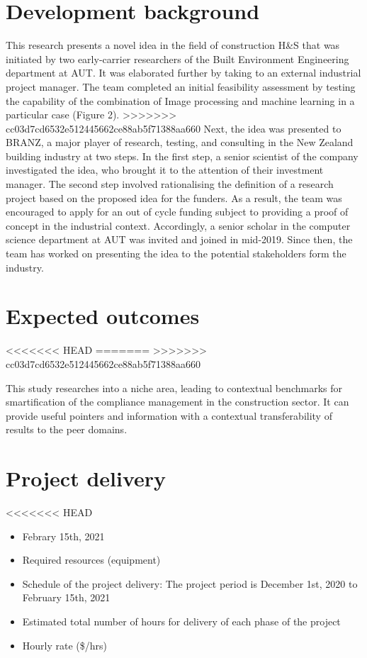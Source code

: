 \documentclass{article}
\begin{document}
\section{Development background}
\label{sec:orge4e1137}

This research presents a novel idea in the field of construction H\&S that was initiated by two early-carrier researchers of the Built Environment Engineering department at AUT. It was elaborated further by taking to an external industrial project manager.
The team completed an initial feasibility assessment by testing the capability of the combination of Image processing and machine learning in a particular case (Figure 2).
>>>>>>> cc03d7cd6532e512445662ce88ab5f71388aa660
Next, the idea was presented to BRANZ, a major player of research, testing, and consulting in the New Zealand building industry at two steps.
In the first step, a senior scientist of the company investigated the idea, who brought it to the attention of their investment manager.
The second step involved rationalising the definition of a research project based on the proposed idea for the funders. As a result, the team was encouraged to apply for an out of cycle funding subject to providing a proof of concept in the industrial context.
Accordingly, a senior scholar in the computer science department at AUT was invited and joined in mid-2019.
Since then, the team has worked on presenting the idea to the potential stakeholders form the industry. 

\section{Expected outcomes}
<<<<<<< HEAD
\label{sec:org641502f}
=======
\label{sec:org1b974eb}
>>>>>>> cc03d7cd6532e512445662ce88ab5f71388aa660

  This study researches into a niche area, leading to contextual benchmarks for smartification of the compliance management in the construction sector.
It can provide useful pointers and information with a contextual transferability of results to the peer domains.

\section{Project delivery}
<<<<<<< HEAD
\label{sec:org6aa4890}
\begin{itemize}
\item Febrary 15th, 2021
\item Required resources (equipment)
\item Schedule of the project delivery: The project period is December 1st, 2020 to February 15th, 2021
\item Estimated total number of hours for delivery of each phase of the project
\item Hourly rate (\$/hrs)
\end{itemize}
\end{document}
